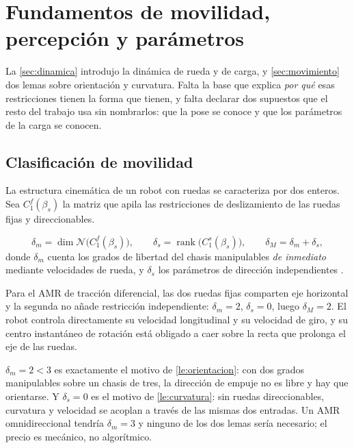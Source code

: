 \section{Fundamentos de movilidad, percepción y parámetros}
\label{sec:fundamentos}

La \cref{sec:dinamica} introdujo la dinámica de rueda y de carga, y
\cref{sec:movimiento} dos lemas sobre orientación y curvatura. Falta la base
que explica \emph{por qué} esas restricciones tienen la forma que tienen, y
falta declarar dos supuestos que el resto del trabajo usa sin nombrarlos: que la
pose se conoce y que los parámetros de la carga se conocen.

\subsection{Clasificación de movilidad}

La estructura cinemática de un robot con ruedas se caracteriza por dos enteros.
Sea $C_1^{f}(\beta_s)$ la matriz que apila las restricciones de deslizamiento de
las ruedas fijas y direccionables.

\begin{definicion}
\label{def:movilidad}
\[
  \delta_m=\dim\mathcal N\bigl(C_1^{f}(\beta_s)\bigr),\qquad
  \delta_s=\operatorname{rank}\bigl(C_1^{s}(\beta_s)\bigr),\qquad
  \delta_M=\delta_m+\delta_s ,
\]
donde $\delta_m$ cuenta los grados de libertad del chasis manipulables
\emph{de inmediato} mediante velocidades de rueda, y $\delta_s$ los parámetros
de dirección independientes \cite{siegwart2011introduction}.
\end{definicion}

Para el AMR de tracción diferencial, las dos ruedas fijas comparten eje
horizontal y la segunda no añade restricción independiente: $\delta_m=2$,
$\delta_s=0$, luego $\delta_M=2$. El robot controla directamente su velocidad
longitudinal y su velocidad de giro, y su centro instantáneo de rotación está
obligado a caer sobre la recta que prolonga el eje de las ruedas.

\begin{observacion}
\label{obs:origen-lemas}
$\delta_m=2<3$ es exactamente el motivo de \cref{le:orientacion}: con dos grados
manipulables sobre un chasis de tres, la dirección de empuje no es libre y hay
que orientarse. Y $\delta_s=0$ es el motivo de \cref{le:curvatura}: sin ruedas
direccionables, curvatura y velocidad se acoplan a través de las mismas dos
entradas. Un AMR omnidireccional tendría $\delta_m=3$ y ninguno de los dos lemas
sería necesario; el precio es mecánico, no algorítmico.
\end{observacion}

